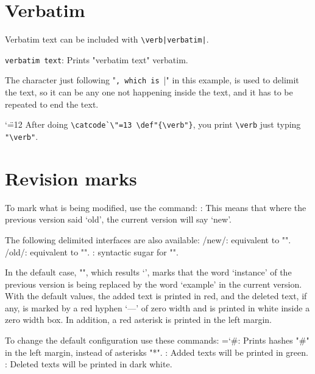 \section{Verbatim}

Verbatim text can be included with \verb!\verb|verbatim|!.

\command\verb|verbatim text|: Prints "verbatim text" verbatim.

The character just following "\verb", which is "|" in this example,
is used to delimit the text, so it can be any one not happening
inside the text, and it has to be repeated to end the text.

{\catcode`\"=12
After doing \verb|\catcode`\"=13 \def"{\verb"}|,
you print \verb|\verb| just typing \verb|"\verb"|.}\par


\section{Revision marks}

To mark what is being modified, use the command:
\command{}: This means that where the previous
 version said `old', the current version will say `new'.

\continuepar
The following delimited interfaces are also available:
\command\new/new\wen/: equivalent to "".
\command\del/old\led/: equivalent to "".
\command{}: syntactic sugar for "".


In the default case, "",
which results `',
marks that the word `instance' of the previous version
is being replaced by the word `example' in the current version.
With the default values, the added text is printed in red,
and the deleted text, if any, is marked
 by a red hyphen `{---\endcolor}' of zero width
 and is printed in white inside a zero width box.
In addition, a red asterisk is printed in the left margin.

To change the default configuration use these commands:
\command\chardef\diffchar=`\#: Prints hashes "#" in the left margin,
 instead of asterisks "*".
\command\def\colornew{Green}: Added texts will be printed
 in green\endcolor.
\command\def\colordel{DarkWhite}: Deleted texts will be printed
 in dark white\endcolor.

